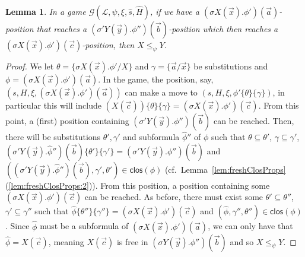 \documentclass[10pt,a4paper]{article}
\newtheorem{lemma}[theorem]{Lemma}
\theoremstyle{definition}
\theoremstyle{remark}
\newcommand\Gcal{\mathcal{G}}
\newcommand\Lcal{\mathcal{L}}
\newcommand{\clos}[0]{\mathsf{clos}}
\newcommand\lemmapoint[2]{Lemma~\ref{#1}(\ref{#1:#2})}
\begin{document}
\begin{lemma}\label{lem:parityNom2}
	In a game $\Gcal(\Lcal, \psi, \xi, \hat s, \hat H)$, 
	if we have a $(\sigma X(\vec x).\phi')(\vec a)$-position  that reaches a $(\sigma' Y(\vec y).\phi'')(\vec b)$-position which then reaches a $(\sigma X(\vec x).\phi')(\vec c)$-position, then $X \le_\psi Y$.  
\end{lemma}\begin{proof}
	We let $\theta = \{\sigma X(\vec x).\phi'/ X\}$ and $\gamma = \{\vec a/ \vec x\}$ be substitutions and $\phi=(\sigma X(\vec x).\phi')(\vec a)$.
	In the game, the position, say, $(s, H, \xi, (\sigma X(\vec x).\phi')(\vec a))$ can make a move to $(s, H, \xi, \phi'\{\theta\}\{\gamma\})$, in particular this will include $(X(\vec c))\{\theta\}\{\gamma\} = (\sigma X(\vec x).\phi')(\vec c)$. 
	From this point, a (first) position containing $(\sigma' Y(\vec y).\phi'')(\vec b)$ can be reached.
	Then, there will be substitutions $\theta', \gamma'$ and subformula $\hat\phi''$ of $\phi$ such that $\theta \subseteq \theta'$, $\gamma \subseteq \gamma'$,
	$(\sigma'Y(\vec y).\hat \phi'')(\vec b)\{\theta'\}\{\gamma'\} = (\sigma' Y(\vec y).\phi'')(\vec b)$
	and 
	$((\sigma' Y(\vec y).\hat\phi'')(\vec b), \gamma', \theta') \in \clos(\phi)$
	(cf.~\lemmapoint{lem:freshClosProps}{2}).
	From this position, a position containing some $(\sigma X(\vec x).\phi')(\vec c)$ can be reached.
	As before,
	there must exist some $\theta' \subseteq \theta''$, $\gamma' \subseteq \gamma''$ 
	such that $\hat \phi\{\theta''\}\{\gamma''\} = (\sigma X(\vec x).\phi')(\vec c)$ and $(\hat \phi, \gamma'', \theta'') \in \clos(\phi)$. 
	Since $\hat \phi$ must be a subformula of $(\sigma X(\vec x).\phi')(\vec a)$, we can only have that $\hat \phi = X(\vec c)$, 
	meaning $X(\vec c)$ is free in $(\sigma Y(\vec y).\phi'')(\vec b)$ and so $X \le_\psi Y$.
\end{proof}

\FnomSatPar*
\end{document}
